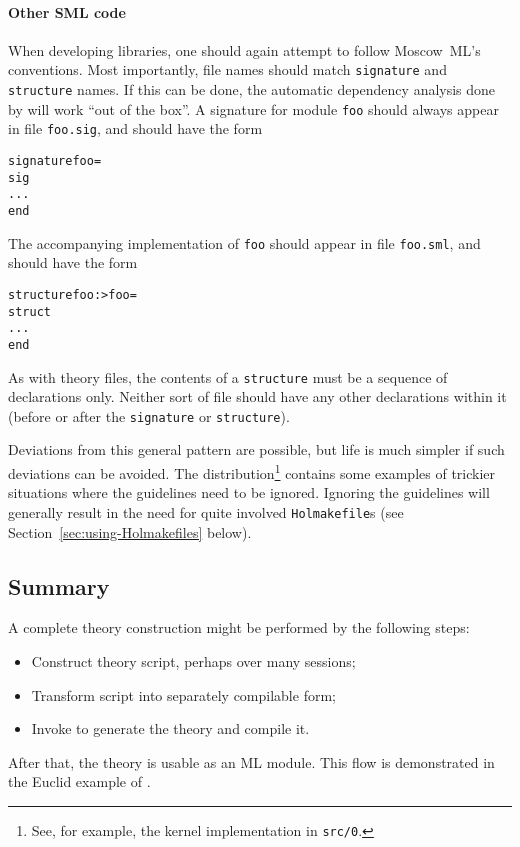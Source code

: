 \paragraph{Other SML code}
When developing \HOL{} libraries, one should again attempt to follow Moscow~ML's conventions.
Most importantly, file names should match \texttt{signature} and \texttt{structure} names.
If this can be done, the automatic dependency analysis done by \holmake{} will work ``out of the box''.
A signature for module \texttt{foo} should always appear in file \texttt{foo.sig}, and should have the form
\begin{alltt}
    signature foo =
    sig
      ...
    end
\end{alltt}
The accompanying implementation of \texttt{foo} should appear in file \texttt{foo.sml}, and should have the form
\begin{alltt}
    structure foo :> foo =
    struct
    ...
    end
\end{alltt}
As with theory files, the contents of a \texttt{structure} must be a sequence of declarations only.
Neither sort of file should have any other declarations within it (before or after the \texttt{signature} or \texttt{structure}).

Deviations from this general pattern are possible, but life is much simpler if such deviations can be avoided.
The \HOL{} distribution\footnote{See, for example, the kernel implementation in \texttt{src/0}.} contains some examples of trickier situations where the guidelines need to be ignored.
Ignoring the guidelines will generally result in the need for quite involved \texttt{Holmakefile}s (see Section~\ref{sec:using-Holmakefiles} below).

\subsection{Summary}

A complete theory construction might be performed by the following steps:
\begin{itemize}
\item Construct theory script, perhaps over many sessions;
\item Transform script into separately compilable form;
\item Invoke \holmake{} to generate the theory and compile it.
\end{itemize}
After that, the theory is usable as an ML module.
This flow is demonstrated in the Euclid example of \TUTORIAL.

